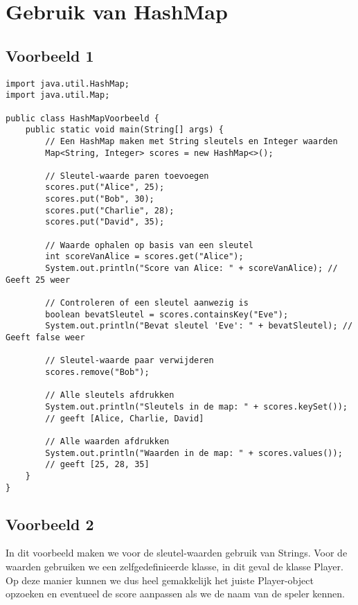 \section{Gebruik van HashMap}

\subsection{Voorbeeld 1}

\begin{lstlisting}
import java.util.HashMap;
import java.util.Map;

public class HashMapVoorbeeld {
    public static void main(String[] args) {
        // Een HashMap maken met String sleutels en Integer waarden
        Map<String, Integer> scores = new HashMap<>();

        // Sleutel-waarde paren toevoegen
        scores.put("Alice", 25);
        scores.put("Bob", 30);
        scores.put("Charlie", 28);
        scores.put("David", 35);

        // Waarde ophalen op basis van een sleutel
        int scoreVanAlice = scores.get("Alice");
        System.out.println("Score van Alice: " + scoreVanAlice); // Geeft 25 weer

        // Controleren of een sleutel aanwezig is
        boolean bevatSleutel = scores.containsKey("Eve");
        System.out.println("Bevat sleutel 'Eve': " + bevatSleutel); // Geeft false weer

        // Sleutel-waarde paar verwijderen
        scores.remove("Bob");

        // Alle sleutels afdrukken
        System.out.println("Sleutels in de map: " + scores.keySet()); 
        // geeft [Alice, Charlie, David]

        // Alle waarden afdrukken
        System.out.println("Waarden in de map: " + scores.values()); 
        // geeft [25, 28, 35]
    }
}
\end{lstlisting}

\subsection{Voorbeeld 2}

In dit voorbeeld maken we voor de sleutel-waarden gebruik van Strings. Voor de waarden gebruiken we een zelfgedefinieerde klasse, in dit geval de klasse Player. 
Op deze manier kunnen we dus heel gemakkelijk het juiste Player-object opzoeken en eventueel de score aanpassen als we de naam van de speler kennen.

